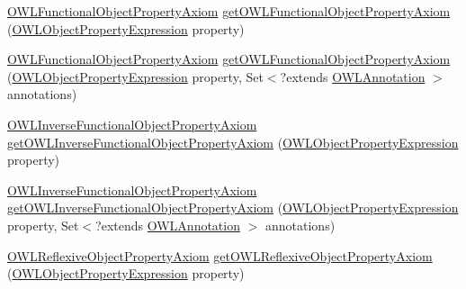 \begin{DoxyCompactItemize}
\item 
\hyperlink{interfaceorg_1_1semanticweb_1_1owlapi_1_1model_1_1_o_w_l_functional_object_property_axiom}{O\-W\-L\-Functional\-Object\-Property\-Axiom} \hyperlink{interfaceorg_1_1semanticweb_1_1owlapi_1_1model_1_1_o_w_l_data_factory_a1e1e1b00bc648e644449ea85b125b20c}{get\-O\-W\-L\-Functional\-Object\-Property\-Axiom} (\hyperlink{interfaceorg_1_1semanticweb_1_1owlapi_1_1model_1_1_o_w_l_object_property_expression}{O\-W\-L\-Object\-Property\-Expression} property)
\item 
\hyperlink{interfaceorg_1_1semanticweb_1_1owlapi_1_1model_1_1_o_w_l_functional_object_property_axiom}{O\-W\-L\-Functional\-Object\-Property\-Axiom} \hyperlink{interfaceorg_1_1semanticweb_1_1owlapi_1_1model_1_1_o_w_l_data_factory_af04091a542fce7d63993b12e1cc823f7}{get\-O\-W\-L\-Functional\-Object\-Property\-Axiom} (\hyperlink{interfaceorg_1_1semanticweb_1_1owlapi_1_1model_1_1_o_w_l_object_property_expression}{O\-W\-L\-Object\-Property\-Expression} property, Set$<$?extends \hyperlink{interfaceorg_1_1semanticweb_1_1owlapi_1_1model_1_1_o_w_l_annotation}{O\-W\-L\-Annotation} $>$ annotations)
\item 
\hyperlink{interfaceorg_1_1semanticweb_1_1owlapi_1_1model_1_1_o_w_l_inverse_functional_object_property_axiom}{O\-W\-L\-Inverse\-Functional\-Object\-Property\-Axiom} \hyperlink{interfaceorg_1_1semanticweb_1_1owlapi_1_1model_1_1_o_w_l_data_factory_a28913c3a5c8cc8cf248ba9d7d3d40cc5}{get\-O\-W\-L\-Inverse\-Functional\-Object\-Property\-Axiom} (\hyperlink{interfaceorg_1_1semanticweb_1_1owlapi_1_1model_1_1_o_w_l_object_property_expression}{O\-W\-L\-Object\-Property\-Expression} property)
\item 
\hyperlink{interfaceorg_1_1semanticweb_1_1owlapi_1_1model_1_1_o_w_l_inverse_functional_object_property_axiom}{O\-W\-L\-Inverse\-Functional\-Object\-Property\-Axiom} \hyperlink{interfaceorg_1_1semanticweb_1_1owlapi_1_1model_1_1_o_w_l_data_factory_a043d2aed5174185e7e318bee97887558}{get\-O\-W\-L\-Inverse\-Functional\-Object\-Property\-Axiom} (\hyperlink{interfaceorg_1_1semanticweb_1_1owlapi_1_1model_1_1_o_w_l_object_property_expression}{O\-W\-L\-Object\-Property\-Expression} property, Set$<$?extends \hyperlink{interfaceorg_1_1semanticweb_1_1owlapi_1_1model_1_1_o_w_l_annotation}{O\-W\-L\-Annotation} $>$ annotations)
\item 
\hyperlink{interfaceorg_1_1semanticweb_1_1owlapi_1_1model_1_1_o_w_l_reflexive_object_property_axiom}{O\-W\-L\-Reflexive\-Object\-Property\-Axiom} \hyperlink{interfaceorg_1_1semanticweb_1_1owlapi_1_1model_1_1_o_w_l_data_factory_a8b536ece9bb35a67a5addad4d8158fda}{get\-O\-W\-L\-Reflexive\-Object\-Property\-Axiom} (\hyperlink{interfaceorg_1_1semanticweb_1_1owlapi_1_1model_1_1_o_w_l_object_property_expression}{O\-W\-L\-Object\-Property\-Expression} property)

\end{DoxyCompactItemize}
